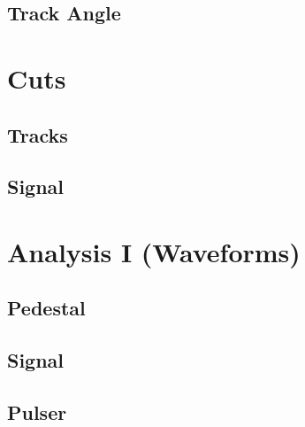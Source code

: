 \documentclass[9pt]{beamer}
\begin{document}
\subsection{Track Angle}
\begin{frame}
\end{frame}
\section{Cuts}
\subsection{Tracks}
\begin{frame}
\end{frame}
\subsection{Signal}
\begin{frame}
\end{frame}
\section{Analysis I (Waveforms)}
\subsection{Pedestal}
\begin{frame}
\end{frame}
\subsection{Signal}
\begin{frame}
\end{frame}
\subsection{Pulser}
\begin{frame}
\end{frame}
\end{document}
